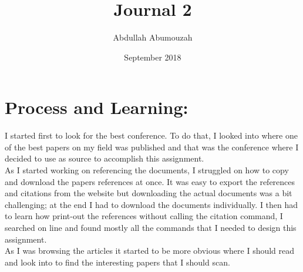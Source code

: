 \documentclass{article}
\title{Journal 2}
\author{Abdullah Abumouzah}
\date{September 2018}
\begin{document}
\maketitle

\nocite{*}
\section{Process and Learning:}
I started first to look for the best conference. To do that, I looked into where one of the best papers on my field was published and that was the conference where I decided to use as source to accomplish this assignment.\\ 
As I started working on referencing the documents, I struggled on how to copy and download the papers references at once. It was easy to export the references and citations from the website but downloading the actual documents was a bit challenging; at the end I had to download the documents individually. 
I then had to learn how print-out the references without calling the  citation command, I searched on line and found mostly all the commands that I needed to design this assignment.\\
As I was browsing the articles it started to be more obvious where I should read and look into to find the interesting papers that I should scan. 
\end{document}
